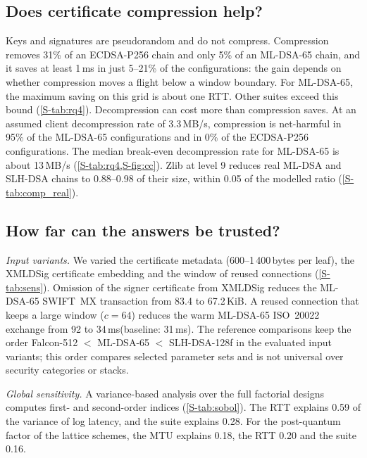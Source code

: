 \documentclass[preprint,12pt]{elsarticle}
\newcommand{\ms}{\,ms\xspace}
\begin{document}
\subsection{Does certificate compression help?}
Keys and signatures are pseudorandom and do not compress. Compression removes 31\% of an ECDSA-P256 chain and only 5\% of an ML-DSA-65 chain, and it saves at least 1\ms in just 5--21\% of the configurations: the gain depends on whether compression moves a flight below a window boundary. For ML-DSA-65, the maximum saving on this grid is about one RTT. Other suites exceed this bound (\cref{S-tab:rq4}). Decompression can cost more than compression saves. At an assumed client decompression rate of 3.3\,MB/s, compression is net-harmful in 95\% of the ML-DSA-65 configurations and in 0\% of the ECDSA-P256 configurations. The median break-even decompression rate for ML-DSA-65 is about 13\,MB/s (\cref{S-tab:rq4,S-fig:cc}). Zlib at level 9 reduces real ML-DSA and SLH-DSA chains to 0.88--0.98 of their size, within 0.05 of the modelled ratio (\cref{S-tab:comp_real}).

\subsection{How far can the answers be trusted?}
\label{sec:sens}\label{sec:rq5}
\emph{Input variants.} We varied the certificate metadata (600--1\,400\,bytes per leaf), the XMLDSig certificate embedding and the window of reused connections (\cref{S-tab:sens}). Omission of the signer certificate from XMLDSig reduces the ML-DSA-65 SWIFT~MX transaction from 83.4 to 67.2\,KiB. A reused connection that keeps a large window ($c=64$) reduces the warm ML-DSA-65 ISO~20022 exchange from 92 to 34\ms (baseline: 31\ms). The reference comparisons keep the order Falcon-512 $<$ ML-DSA-65 $<$ SLH-DSA-128f in the evaluated input variants; this order compares selected parameter sets and is not universal over security categories or stacks.

\emph{Global sensitivity.} A variance-based analysis over the full factorial designs computes first- and second-order indices (\cref{S-tab:sobol}). The RTT explains 0.59 of the variance of log latency, and the suite explains 0.28. For the post-quantum factor of the lattice schemes, the MTU explains 0.18, the RTT 0.20 and the suite 0.16.
\end{document}
